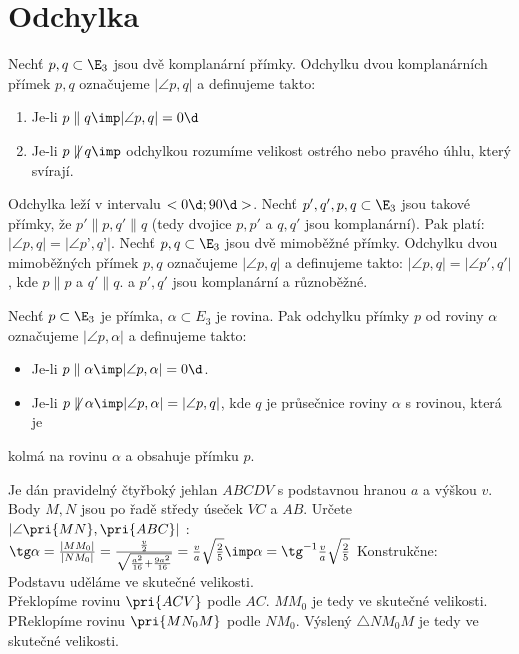 
\let\braceru=\relax \let\bracelu=\relax 
\def\o#1{\setbox0=
	\hbox{$\kern2pt\overbrace{\kern-2pt#1\kern-2pt}\kern2pt$}\ht0=2.1ex\box0}
\def\to#1{\hbox{#1\rlap{\t{}}}}
\def\rad{\rm{rad}}
\def\f{\frac}
\section{Odchylka}
\Def Nechť $p,q\subset \E_3$ jsou  dvě komplanární přímky. Odchylku dvou komplanárních přímek
$p,q$ označujeme $|\angle p ,q|$ a definujeme takto:
\begin{enumerate}
	\item Je-li $p\parallel q \imp |\angle p,q| = 0\d$
	\item Je-li $p\not\parallel q \imp $ odchylkou rozumíme velikost ostrého nebo pravého úhlu, který svírají.
\end{enumerate}

\Poz Odchylka leží v intervalu $<0\d;90\d>$.
\V  Nechť $p',q', p, q \subset\E_3$ jsou takové přímky, že $p'\parallel p, q'\parallel q$ (tedy dvojice $p, p'$ a $q, q'$ jsou
komplanární). Pak platí: $|\angle p ,q| =  |\angle p’, q’|$.
\Def Nechť $p, q \subset \E_3$ jsou dvě mimoběžné přímky. Odchylku dvou mimoběžných přímek $p,q$
označujeme $|\angle p ,q|$ a definujeme takto: $|\angle p ,q| = |\angle p', q'|$, kde $p\parallel p$ a $q' \parallel q$. a $p',q'$
jsou komplanární a různoběžné.

\Def Nechť $p \subset\E_3$ je přímka, $\alpha \subset E_3$ je rovina. Pak odchylku přímky $p$ od roviny $\alpha$
označujeme $|\angle p , \alpha|$ a definujeme takto:
\begin{itemize}
	\item Je-li $p \parallel \alpha \imp |\angle p,\alpha| = 0\d$.
	\item Je-li $p\not\parallel \alpha \imp|\angle p,\alpha|=|\angle p,q|$, kde $q$ je průsečnice roviny $\alpha$ s rovinou, která je
\end{itemize}
kolmá na rovinu $\alpha$ a obsahuje přímku $p$.

\Pr Je dán pravidelný čtyřboký jehlan $ABCDV$
s podstavnou hranou $a$ a výškou $v$.
Body $M,N$ jsou po řadě středy úseček $VC$ a
$AB$. Určete $|\angle \pri{MN},\pri{ABC}|$ : 
$\tg \alpha = \f{|MM_0|}{|NM_0|}=\f{\f v 2}{\sqrt{\f{a^2}{16}+\f{9a^2}{16}}}=\f{v}{a}\*\sqrt{\f 2 5} \imp \alpha = \tg^{-1} \f{v}{a}\*\sqrt{\f 2 5}$
Konstrukčne:\\
Podstavu uděláme ve skutečné velikosti.\\
Překlopíme rovinu $\pri{ACV}$ podle $AC$. $MM_0$ je tedy ve skutečné velikosti.\\
PReklopíme rovinu $\pri{MN_0M}$ podle $NM_0$. Výslený $\triangle NM_0M$ je tedy ve skutečné velikosti.

